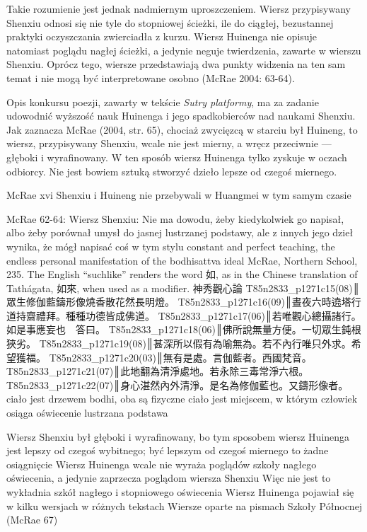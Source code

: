 Takie rozumienie jest jednak nadmiernym uproszczeniem. Wiersz przypisywany Shenxiu odnosi się nie tyle do stopniowej ścieżki, ile do ciągłej, bezustannej praktyki oczyszczania zwierciadła z kurzu.
Wiersz Huinenga nie opisuje natomiast poglądu nagłej ścieżki, a jedynie neguje twierdzenia, zawarte w wierszu Shenxiu.
Oprócz tego, wiersze przedstawiają dwa punkty widzenia na ten sam temat i nie mogą być interpretowane osobno
(McRae 2004: 63-64).

Opis konkursu poezji, zawarty w tekście \textit{Sutry platformy}, ma za zadanie udowodnić wyższość nauk Huinenga i jego spadkobierców nad naukami Shenxiu.
Jak zaznacza McRae (2004, str. 65), chociaż zwycięzcą w starciu był Huineng, to wiersz, przypisywany Shenxiu, wcale nie jest mierny, a wręcz przeciwnie --- głęboki i wyrafinowany.
W ten sposób wiersz Huinenga tylko zyskuje w oczach odbiorcy. Nie jest bowiem sztuką stworzyć dzieło lepsze od czegoś miernego.

McRae xvi
Shenxiu i Huineng nie przebywali w Huangmei w tym samym czasie

McRae 62-64:
Wiersz Shenxiu:
Nie ma dowodu, żeby kiedykolwiek go napisał, albo żeby porównał umysł do jasnej lustrzanej podstawy, ale z innych jego dzieł wynika, że mógł napisać coś w tym stylu
constant and perfect teaching, the endless personal manifestation of the
bodhisattva ideal
McRae, Northern School, 235. The English “suchlike'' renders the word 如, as in the Chinese translation of Tathágata, 如來, when used as a modifier.
神秀觀心論
T85n2833_p1271c15(08)║眾生修伽藍鑄形像燒香散花然長明燈。
T85n2833_p1271c16(09)║晝夜六時遶塔行道持齋禮拜。種種功德皆成佛道。
T85n2833_p1271c17(06)║若唯觀心總攝諸行。如是事應妄也　答曰。
T85n2833_p1271c18(06)║佛所說無量方便。一切眾生鈍根狹劣。
T85n2833_p1271c19(08)║甚深所以假有為喻無為。若不內行唯只外求。希望獲福。
T85n2833_p1271c20(03)║無有是處。言伽藍者。西國梵音。
T85n2833_p1271c21(07)║此地翻為清淨處地。若永除三毒常淨六根。
T85n2833_p1271c22(07)║身心湛然內外清淨。是名為修伽藍也。又鑄形像者。
ciało jest drzewem bodhi, oba są fizyczne
ciało jest miejscem, w którym człowiek osiąga oświecenie
lustrzana podstawa

Wiersz Shenxiu był głęboki i wyrafinowany, bo tym sposobem wiersz Huinenga jest lepszy od czegoś wybitnego; być lepszym od czegoś miernego to żadne osiągnięcie
Wiersz Huinenga wcale nie wyraża poglądów szkoły nagłego oświecenia, a jedynie zaprzecza poglądom wiersza Shenxiu
Więc nie jest to wykładnia szkół nagłego i stopniowego oświecenia
Wiersz Huinenga pojawiał się w kilku wersjach w różnych tekstach
Wiersze oparte na pismach Szkoły Północnej (McRae 67)

